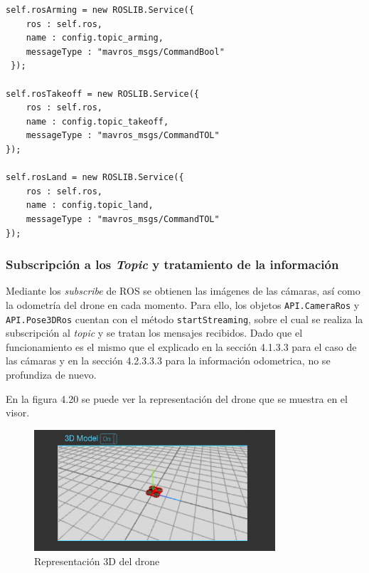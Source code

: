 \begin{lstlisting}[caption= {Definición de los mensajes para arrancar, despegar y aterrizar}, label=cod.mensajeextradrone]
self.rosArming = new ROSLIB.Service({
	ros : self.ros,
	name : config.topic_arming,
	messageType : "mavros_msgs/CommandBool"
 });

self.rosTakeoff = new ROSLIB.Service({
	ros : self.ros,
	name : config.topic_takeoff,
	messageType : "mavros_msgs/CommandTOL"
});

self.rosLand = new ROSLIB.Service({
	ros : self.ros,
	name : config.topic_land,
	messageType : "mavros_msgs/CommandTOL"
});
\end{lstlisting}

\subsubsection{Subscripción a los \textit{Topic} y tratamiento de la información}

Mediante los \textit{subscribe} de ROS se obtienen las imágenes de las cámaras, así como la odometría del drone en cada momento. Para ello, los objetos \texttt{API.CameraRos} y \texttt{API.Pose3DRos} cuentan con el método \texttt{startStreaming}, sobre el cual se realiza la subscripción al \textit{topic} y se tratan los mensajes recibidos. Dado que el funcionamiento es el mismo que el explicado en la sección 4.1.3.3 para el caso de las cámaras y en la sección 4.2.3.3.3 para la información odometrica, no se profundiza de nuevo.

En la figura 4.20 se puede ver la representación del drone que se muestra en el visor.

\begin{figure}[H]
  \begin{center}
    \includegraphics[width=0.8\textwidth]{figures/3ddrone.png}
		\caption{Representación 3D del drone}
		\label{fig.3ddrone}
		\end{center}
\end{figure}

